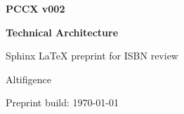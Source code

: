 \begin{titlepage}
\thispagestyle{empty}
\vspace*{2.5cm}

{\sffamily\bfseries\fontsize{30}{36}\selectfont PCCX\texttrademark{} v002\par}
\vspace{0.5cm}
{\sffamily\bfseries\fontsize{18}{22}\selectfont Technical Architecture\par}
\vspace{1.0cm}
{\sffamily\fontsize{12}{16}\selectfont Sphinx LaTeX preprint for ISBN review\par}

\vfill

{\sffamily\fontsize{12}{16}\selectfont Altifigence\texttrademark{}\par}
{\sffamily\fontsize{10}{14}\selectfont Preprint build: \today\par}

\end{titlepage}
